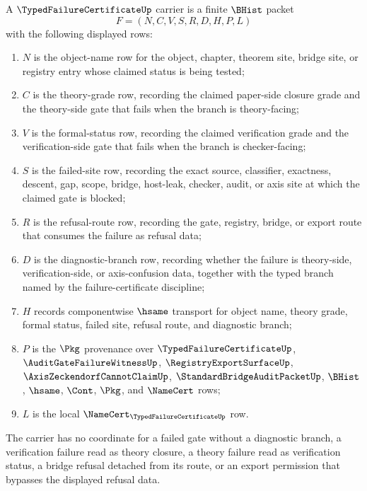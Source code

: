 \begin{definition}
\label{def:typed-failure-certificate-carrier}
A $\TypedFailureCertificateUp$ carrier is a finite $\BHist$ packet
$$
F=(N,C,V,S,R,D,H,P,L)
$$
with the following displayed rows:
\begin{enumerate}
\item $N$ is the object-name row for the object, chapter, theorem site, bridge site, or registry entry whose claimed status is being tested;
\item $C$ is the theory-grade row, recording the claimed paper-side closure grade and the theory-side gate that fails when the branch is theory-facing;
\item $V$ is the formal-status row, recording the claimed verification grade and the verification-side gate that fails when the branch is checker-facing;
\item $S$ is the failed-site row, recording the exact source, classifier, exactness, descent, gap, scope, bridge, host-leak, checker, audit, or axis site at which the claimed gate is blocked;
\item $R$ is the refusal-route row, recording the gate, registry, bridge, or export route that consumes the failure as refusal data;
\item $D$ is the diagnostic-branch row, recording whether the failure is theory-side, verification-side, or axis-confusion data, together with the typed branch named by the failure-certificate discipline;
\item $H$ records componentwise $\hsame$ transport for object name, theory grade, formal status, failed site, refusal route, and diagnostic branch;
\item $P$ is the $\Pkg$ provenance over $\TypedFailureCertificateUp$, $\AuditGateFailureWitnessUp$, $\RegistryExportSurfaceUp$, $\AxisZeckendorfCannotClaimUp$, $\StandardBridgeAuditPacketUp$, $\BHist$, $\hsame$, $\Cont$, $\Pkg$, and $\NameCert$ rows;
\item $L$ is the local $\NameCert_{\TypedFailureCertificateUp}$ row.
\end{enumerate}
The carrier has no coordinate for a failed gate without a diagnostic branch, a verification failure read as theory closure, a theory failure read as verification status, a bridge refusal detached from its route, or an export permission that bypasses the displayed refusal data.
\end{definition}

